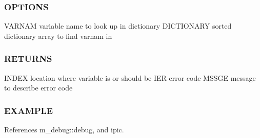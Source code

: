 \subsubsection*{O\+P\+T\+I\+O\+NS}

V\+A\+R\+N\+AM variable name to look up in dictionary D\+I\+C\+T\+I\+O\+N\+A\+RY sorted dictionary array to find varnam in

\subsubsection*{R\+E\+T\+U\+R\+NS}

I\+N\+D\+EX location where variable is or should be I\+ER error code M\+S\+S\+GE message to describe error code

\subsubsection*{E\+X\+A\+M\+P\+LE}

References m\+\_\+debug\+::debug, and ipic.

